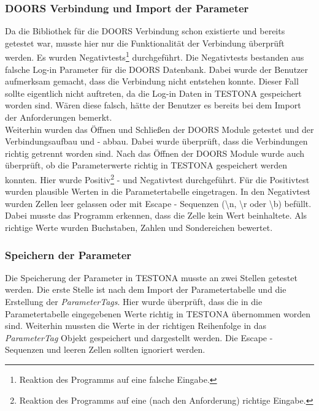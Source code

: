 \subsubsection{DOORS Verbindung und Import der Parameter}
Da die Bibliothek für die DOORS Verbindung schon existierte und bereits getestet war, musste hier nur die Funktionalität der Verbindung überprüft werden. Es wurden Negativtests\footnote{Reaktion des Programms auf eine falsche Eingabe.} durchgeführt. Die Negativtests bestanden aus falsche Log-in Parameter für die DOORS Datenbank. Dabei wurde der Benutzer aufmerksam gemacht, dass die Verbindung nicht entstehen konnte. Dieser Fall sollte eigentlich nicht auftreten, da die Log-in Daten in TESTONA gespeichert worden sind. Wären diese falsch, hätte der Benutzer es bereits bei dem Import der Anforderungen bemerkt.\\


Weiterhin wurden das Öffnen und Schließen der DOORS Module getestet und der Verbindungsaufbau und - abbau. Dabei wurde überprüft, dass die Verbindungen richtig getrennt worden sind. Nach das Öffnen der DOORS Module wurde auch überprüft, ob die Parameterwerte richtig in TESTONA gespeichert werden konnten. Hier wurde Positiv\footnote{Reaktion des Programms auf eine (nach den Anforderung) richtige Eingabe.} - und Negativtest durchgeführt. Für die Positivtest wurden plausible Werten in die Parametertabelle eingetragen. In den Negativtest wurden Zellen leer gelassen oder mit Escape - Sequenzen (\textbackslash n, \textbackslash r oder \textbackslash b) befüllt. Dabei musste das Programm erkennen, dass die Zelle kein Wert beinhaltete. Als richtige Werte wurden Buchstaben, Zahlen und Sondereichen bewertet.\\



\subsubsection{Speichern der Parameter}
Die Speicherung der Parameter in TESTONA musste an zwei Stellen getestet werden. Die erste Stelle ist nach dem Import der Parametertabelle und die Erstellung der \textit{ParameterTags}. Hier wurde überprüft, dass die in die Parametertabelle eingegebenen Werte richtig in TESTONA übernommen worden sind. Weiterhin mussten die Werte in der richtigen Reihenfolge in das \textit{ParameterTag} Objekt gespeichert und dargestellt werden. Die Escape - Sequenzen und leeren Zellen sollten ignoriert werden. \\


